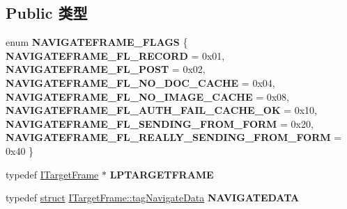 \subsection*{Public 类型}
\begin{DoxyCompactItemize}
\item 
\mbox{\label{interface_i_target_frame_abf56a3bc584bdf3f7a843da4e0e8aa18}} 
enum {\bfseries N\+A\+V\+I\+G\+A\+T\+E\+F\+R\+A\+M\+E\+\_\+\+F\+L\+A\+GS} \{ \newline
{\bfseries N\+A\+V\+I\+G\+A\+T\+E\+F\+R\+A\+M\+E\+\_\+\+F\+L\+\_\+\+R\+E\+C\+O\+RD} = 0x01, 
{\bfseries N\+A\+V\+I\+G\+A\+T\+E\+F\+R\+A\+M\+E\+\_\+\+F\+L\+\_\+\+P\+O\+ST} = 0x02, 
{\bfseries N\+A\+V\+I\+G\+A\+T\+E\+F\+R\+A\+M\+E\+\_\+\+F\+L\+\_\+\+N\+O\+\_\+\+D\+O\+C\+\_\+\+C\+A\+C\+HE} = 0x04, 
{\bfseries N\+A\+V\+I\+G\+A\+T\+E\+F\+R\+A\+M\+E\+\_\+\+F\+L\+\_\+\+N\+O\+\_\+\+I\+M\+A\+G\+E\+\_\+\+C\+A\+C\+HE} = 0x08, 
\newline
{\bfseries N\+A\+V\+I\+G\+A\+T\+E\+F\+R\+A\+M\+E\+\_\+\+F\+L\+\_\+\+A\+U\+T\+H\+\_\+\+F\+A\+I\+L\+\_\+\+C\+A\+C\+H\+E\+\_\+\+OK} = 0x10, 
{\bfseries N\+A\+V\+I\+G\+A\+T\+E\+F\+R\+A\+M\+E\+\_\+\+F\+L\+\_\+\+S\+E\+N\+D\+I\+N\+G\+\_\+\+F\+R\+O\+M\+\_\+\+F\+O\+RM} = 0x20, 
{\bfseries N\+A\+V\+I\+G\+A\+T\+E\+F\+R\+A\+M\+E\+\_\+\+F\+L\+\_\+\+R\+E\+A\+L\+L\+Y\+\_\+\+S\+E\+N\+D\+I\+N\+G\+\_\+\+F\+R\+O\+M\+\_\+\+F\+O\+RM} = 0x40
 \}
\item 
\mbox{\label{interface_i_target_frame_a5154b741345617df64bc3d973eff596a}} 
typedef \hyperlink{interface_i_target_frame}{I\+Target\+Frame} $\ast$ {\bfseries L\+P\+T\+A\+R\+G\+E\+T\+F\+R\+A\+ME}
\item 
\mbox{\label{interface_i_target_frame_ac72131e8589b07c2b030642c9eb7d6f5}} 
typedef \hyperlink{interfacestruct}{struct} \hyperlink{struct_i_target_frame_1_1tag_navigate_data}{I\+Target\+Frame\+::tag\+Navigate\+Data} {\bfseries N\+A\+V\+I\+G\+A\+T\+E\+D\+A\+TA}
\end{DoxyCompactItemize}

